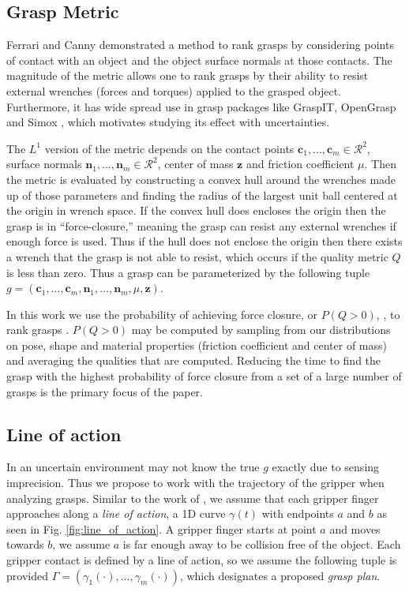 \documentclass[journal,transmag]{IEEEtran}%
\begin{document}
\subsection{Grasp Metric}
Ferrari and Canny \cite{ferrari1992} demonstrated a method to rank grasps by considering points of contact with an object and the object surface normals at those contacts. The magnitude of the metric allows one to rank grasps by their ability to resist external wrenches (forces and torques) applied to the grasped object. Furthermore, it has wide spread use in grasp packages like GraspIT\cite{miller2004graspit}, OpenGrasp\cite{73} and Simox \cite{vahrenkamp2010simo}, which motivates studying its effect with uncertainties. 

The $L^1$ version of the metric depends on the contact points $\textbf{c}_1,...,\textbf{c}_m \in \mathcal{R}^2$, surface normals $\textbf{n}_1,...,\textbf{n}_m \in \mathcal{R}^2$, center of mass $\textbf{z}$ and friction coefficient $\mu$. Then the metric is evaluated by constructing a convex hull around the wrenches made up of those parameters and finding the radius of the largest unit ball centered at the origin in wrench space. If the convex hull does encloses the origin then the grasp is in ``force-closure,'' meaning the grasp can resist any external wrenches if enough force is used. Thus if the hull does not enclose the origin then there exists a wrench that the grasp is not able to resist, which occurs if the quality metric $Q$ is less than zero. Thus a grasp can be parameterized by the following tuple $g = ( \textbf{c}_1,...,\textbf{c}_m,\textbf{n}_1,...,\textbf{n}_m,\mu, \textbf{z} )$.

In this work we use the probability of achieving force closure, or $P(Q>0)$, \cite{christopoulos2007handling}\cite{kehoe2012toward}, to rank grasps . $P(Q>0)$ may be computed by sampling from our distributions on pose, shape and material properties (friction coefficient and center of mass) and averaging the qualities that are computed. Reducing the time to find the grasp with the highest probability of force closure from a set of a large number of grasps is the primary focus of the paper. 

\subsection{Line of action}
In an uncertain environment may not know the true $g$ exactly due to sensing imprecision. Thus we propose to work with the trajectory of the gripper when analyzing grasps. Similar to the work of \cite{christopoulos2007handling}, we assume that each gripper finger approaches along a \textit{line of action}, a 1D curve $\gamma(t)$ with endpoints $a$ and $b$ as seen in Fig. \ref{fig:line_of_action}.
A gripper finger starts at point $a$ and moves towards $b$, we assume $a$ is far enough away to be collision free of the object.
Each gripper contact is defined by a line of action, so we assume the following tuple is provided $\Gamma = ( \gamma_1(\cdot),...,\gamma_m(\cdot) )$, which designates a proposed \textit{grasp plan}.
\end{document}
